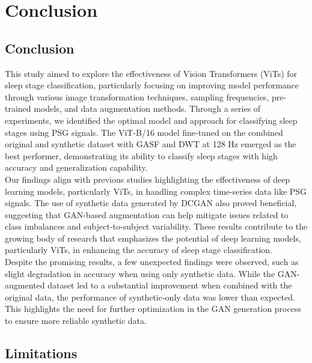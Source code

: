 \chapter{Conclusion}

\section{Conclusion}

This study aimed to explore the effectiveness of Vision Transformers (ViTs) for sleep stage classification, particularly focusing on improving model performance through various image transformation techniques, sampling frequencies, pre-trained models, and data augmentation methods. Through a series of experiments, we identified the optimal model and approach for classifying sleep stages using PSG signals. The ViT-B/16 model fine-tuned on the combined original and synthetic dataset with GASF and DWT at 128 Hz emerged as the best performer, demonstrating its ability to classify sleep stages with high accuracy and generalization capability. \\

Our findings align with previous studies highlighting the effectiveness of deep learning models, particularly ViTs, in handling complex time-series data like PSG signals. The use of synthetic data generated by DCGAN also proved beneficial, suggesting that GAN-based augmentation can help mitigate issues related to class imbalances and subject-to-subject variability. These results contribute to the growing body of research that emphasizes the potential of deep learning models, particularly ViTs, in enhancing the accuracy of sleep stage classification. \\

Despite the promising results, a few unexpected findings were observed, such as slight degradation in accuracy when using only synthetic data. While the GAN-augmented dataset led to a substantial improvement when combined with the original data, the performance of synthetic-only data was lower than expected. This highlights the need for further optimization in the GAN generation process to ensure more reliable synthetic data.

\section{Limitations}

